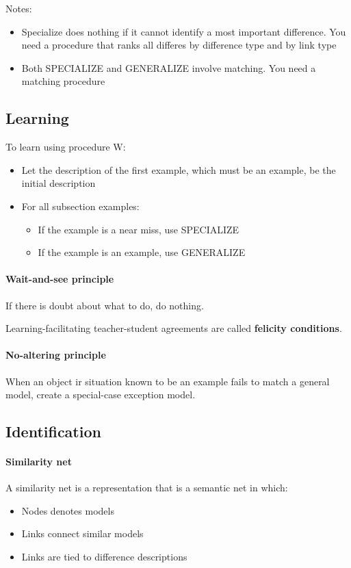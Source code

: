 Notes:
\begin{itemize}
  \item Specialize does nothing if it cannot identify a most
    important difference. You need a procedure that ranks all
    differes by difference type and by link type
  \item Both SPECIALIZE and GENERALIZE involve matching. You need a
    matching procedure
\end{itemize}

\subsection{Learning}

To learn using procedure W:
\begin{itemize}
  \item Let the description of the first example, which must be an
    example, be the initial description
  \item For all subsection examples:
    \begin{itemize}
      \item If the example is a near miss, use SPECIALIZE
      \item If the example is an example, use GENERALIZE
    \end{itemize}
\end{itemize}

\paragraph{Wait-and-see principle} If there is doubt about 
what to do, do nothing.

Learning-facilitating teacher-student agreements are called
\textbf{felicity conditions}.

\paragraph{No-altering principle} When an object ir situation known
to be an example fails to match a general model, create a
special-case exception model.

\subsection{Identification}

\paragraph{Similarity net} A similarity net is a representation
that is a semantic net in which:
\begin{itemize}
  \item Nodes denotes models
  \item Links connect similar models
  \item Links are tied to difference descriptions
\end{itemize}

